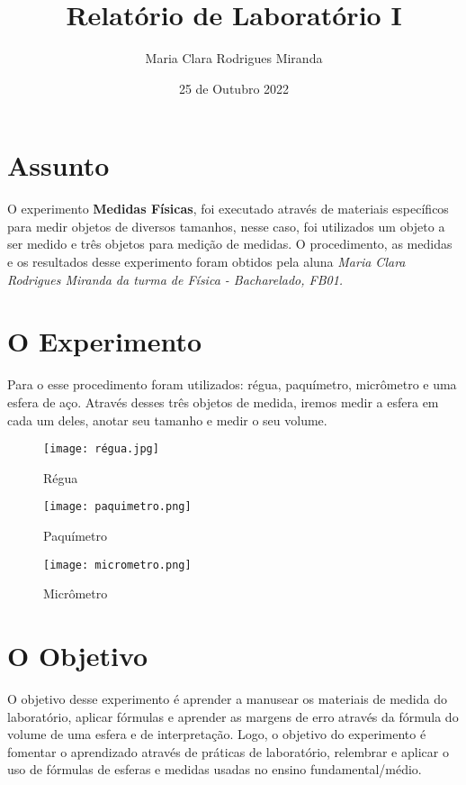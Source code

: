 \documentclass[a4paper, 12pt]{article}
\title{Relatório de Laboratório I}
\author{Maria Clara Rodrigues Miranda}
\date{25 de Outubro 2022}
\begin{document}
\maketitle

\section{Assunto}
O experimento \textbf{Medidas Físicas}, foi executado através de materiais específicos para medir objetos de diversos tamanhos, nesse caso, foi utilizados um objeto a ser medido e três objetos para medição de medidas. O procedimento, as medidas e os resultados desse experimento foram obtidos pela aluna \textit{Maria Clara Rodrigues Miranda da turma de Física - Bacharelado, FB01.}

\section{O Experimento}
Para o esse procedimento foram utilizados: régua, paquímetro, micrômetro e uma esfera de aço. Através desses três objetos de medida, iremos medir a esfera em cada um deles, anotar seu tamanho e medir o seu volume. 


\begin{figure}[ht]
\centering 
\texttt{[image: régua.jpg]} 
\caption{Régua} 
\label{Fig01} 
\end{figure}

\begin{figure}[ht]
\centering 
\texttt{[image: paquimetro.png]} 
\caption{Paquímetro} 
\label{Fig02} 


\end{figure}

\begin{figure}[ht]
\centering 
\texttt{[image: micrometro.png]} 
\caption{Micrômetro} 
\label{Fig03} 
\end{figure}


\section{O Objetivo}
O objetivo desse experimento é aprender a manusear os materiais de medida do laboratório, aplicar fórmulas e aprender as margens de erro através da fórmula do volume de uma esfera e de interpretação. Logo, o objetivo do experimento é fomentar o aprendizado através de práticas de laboratório, relembrar e aplicar o uso de fórmulas de esferas e medidas usadas no ensino fundamental/médio.
\end{document}
